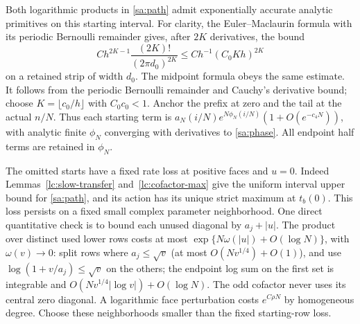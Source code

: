 Both logarithmic products in \eqref{sa:path} admit exponentially
accurate analytic primitives on this starting interval. For clarity,
the Euler--Maclaurin formula with its periodic Bernoulli remainder
\cite[\S2.10(i)]{DLMF} gives, after $2K$ derivatives, the bound
\[
 C h^{2K-1}\frac{(2K)!}{(2\pi d_0)^{2K}}
                   \le C h^{-1}(C_0Kh)^{2K}
\]
on a retained strip of width $d_0$. The midpoint formula obeys the
same estimate. It follows from the periodic Bernoulli remainder and
Cauchy's derivative bound; choose $K=\lfloor c_0/h\rfloor$ with
$C_0c_0<1$. Anchor the prefix at zero and the tail at the actual
$n/N$. Thus each starting term is
$a_N(i/N)e^{N\phi_N(i/N)}(1+O(e^{-c_4N}))$, with analytic finite
$\phi_N$ converging with derivatives to \eqref{sa:phase}.
All endpoint half terms are retained in $\phi_N$.

The omitted starts have a fixed rate loss at positive faces and $u=0$.
Indeed Lemmas~\ref{lc:slow-transfer} and~\ref{lc:cofactor-max} give the uniform interval
upper bound for \eqref{sa:path}, and its action has its unique strict
maximum at $t_b(0)$. This loss persists on a fixed small complex
parameter neighborhood. One direct quantitative check is to bound
each unused diagonal by $a_j+|u|$. The product over distinct used
lower rows costs at most $\exp\{N\omega(|u|)+O(\log N)\}$, with
$\omega(v)\to0$: split rows where $a_j\le\sqrt v$ (at most
$O(Nv^{1/4})+O(1)$), and use $\log(1+v/a_j)\le\sqrt v$ on the
others; the endpoint log sum on the first set is integrable and
$O(Nv^{1/4}|\log v|)+O(\log N)$.
The odd cofactor never uses its central zero diagonal. A logarithmic
face perturbation costs $e^{C\rho N}$ by homogeneous degree. Choose
these neighborhoods smaller than the fixed starting-row loss.

